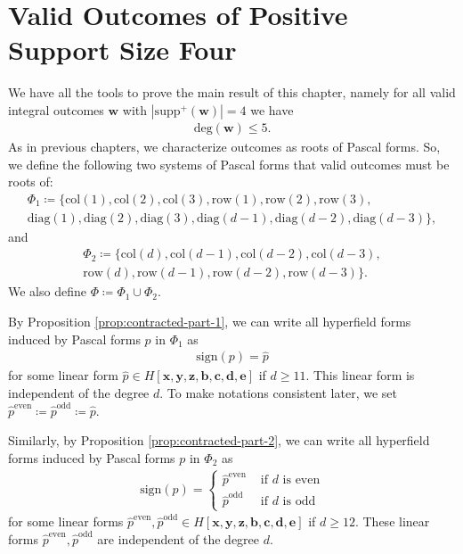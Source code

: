\chapter{Valid Outcomes of Positive Support
Size Four}

We have all the tools to prove the main result of this chapter, namely for all valid integral outcomes \( \mathbf w \) with \( |\mathrm{supp}^+(\mathbf w)| = 4 \) we have
\begin{align*}
    \mathrm{deg}(\mathbf w) \leq 5.
\end{align*}
As in previous chapters, we characterize outcomes as roots of Pascal forms. So, we define the following two systems of Pascal forms that valid outcomes must be roots of:
\begin{gather*}
    \Phi_1 \coloneqq \{ 
        \mathrm{col}(1), \mathrm{col}(2), \mathrm{col}(3), \mathrm{row}(1), \mathrm{row}(2), \mathrm{row}(3),\\
         \mathrm{diag}(1), \mathrm{diag}(2), \mathrm{diag}(3), \mathrm{diag}(d-1), \mathrm{diag}(d-2), \mathrm{diag}(d-3) 
     \},
\end{gather*}
and 
\begin{gather*}
    \Phi_2 \coloneqq \{ 
        \mathrm{col}(d), \mathrm{col}(d-1), \mathrm{col}(d-2), \mathrm{col}(d-3), \\
        \mathrm{row}(d), \mathrm{row}(d-1), \mathrm{row}(d-2), \mathrm{row}(d-3) 
     \}.
\end{gather*}
We also define \( \Phi \coloneqq \Phi_1 \cup \Phi_2 \).

By Proposition \ref{prop:contracted-part-1}, we can write all hyperfield forms induced by Pascal forms \( p \) in \( \Phi_1 \) as 
\begin{align*}
    \mathrm{sign}(p) = \hat p
\end{align*}
for some linear form \( \hat p \in H[\mathbf{x}, \mathbf{y}, \mathbf{z}, \mathbf{b}, \mathbf{c}, \mathbf{d}, \mathbf{e}] \) if \( d \geq 11 \). This linear form is independent of the degree \( d \). To make notations consistent later, we set \( \hat p^{\mathrm{even}} \coloneqq  \hat p^{\mathrm{odd}}  \coloneqq \hat p\).

Similarly, by Proposition \ref{prop:contracted-part-2}, we can write all hyperfield forms induced by Pascal forms \( p \) in \( \Phi_2 \) as
\begin{align*}
    \mathrm{sign}(p) = \begin{cases}
        \hat p^{\mathrm{even}} & \text{ if } d \text{ is even} \\
        \hat p^{\mathrm{odd}} & \text{ if } d \text{ is odd}
    \end{cases}
\end{align*}
for some linear forms \( \hat p^{\mathrm{even}}, \hat p^{\mathrm{odd}} \in H[\mathbf{x}, \mathbf{y}, \mathbf{z}, \mathbf{b}, \mathbf{c}, \mathbf{d}, \mathbf{e}] \) if \( d \geq 12 \). These linear forms \( \hat p^{\mathrm{even}}, \hat p^{\mathrm{odd}}  \) are independent of the degree \( d \).

